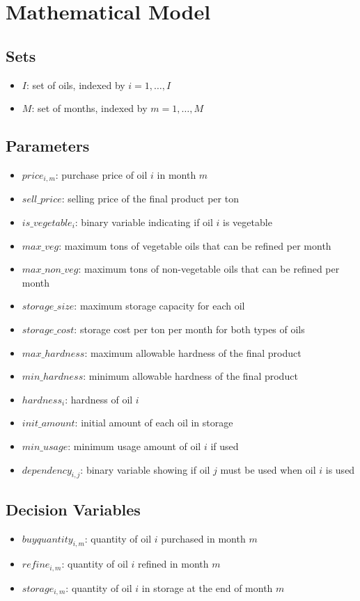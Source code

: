\documentclass{article}
\begin{document}
\section*{Mathematical Model}

\subsection*{Sets}
\begin{itemize}
    \item $I$: set of oils, indexed by $i = 1, \ldots, I$
    \item $M$: set of months, indexed by $m = 1, \ldots, M$
\end{itemize}

\subsection*{Parameters}
\begin{itemize}
    \item $price_{i,m}$: purchase price of oil $i$ in month $m$
    \item $sell\_price$: selling price of the final product per ton
    \item $is\_vegetable_{i}$: binary variable indicating if oil $i$ is vegetable
    \item $max\_veg$: maximum tons of vegetable oils that can be refined per month
    \item $max\_non\_veg$: maximum tons of non-vegetable oils that can be refined per month
    \item $storage\_size$: maximum storage capacity for each oil
    \item $storage\_cost$: storage cost per ton per month for both types of oils
    \item $max\_hardness$: maximum allowable hardness of the final product
    \item $min\_hardness$: minimum allowable hardness of the final product
    \item $hardness_{i}$: hardness of oil $i$
    \item $init\_amount$: initial amount of each oil in storage
    \item $min\_usage$: minimum usage amount of oil $i$ if used
    \item $dependency_{i,j}$: binary variable showing if oil $j$ must be used when oil $i$ is used
\end{itemize}

\subsection*{Decision Variables}
\begin{itemize}
    \item $buyquantity_{i,m}$: quantity of oil $i$ purchased in month $m$
    \item $refine_{i,m}$: quantity of oil $i$ refined in month $m$
    \item $storage_{i,m}$: quantity of oil $i$ in storage at the end of month $m$
\end{itemize}
\end{document}
